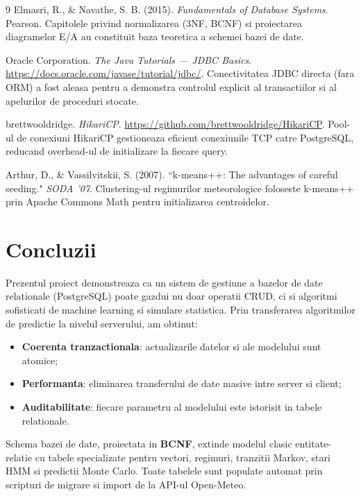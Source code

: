 \documentclass[12pt,a4paper]{article}
\begin{document}
\begin{thebibliography}{9}
 Elmasri, R., \& Navathe, S. B. (2015). \textit{Fundamentals of Database Systems}. Pearson. Capitolele privind normalizarea (3NF, BCNF) si proiectarea diagramelor E/A au constituit baza teoretica a schemei bazei de date.

 Oracle Corporation. \textit{The Java Tutorials --- JDBC Basics}. \url{https://docs.oracle.com/javase/tutorial/jdbc/}. Conectivitatea JDBC directa (fara ORM) a fost aleasa pentru a demonstra controlul explicit al transactiilor si al apelurilor de proceduri stocate.

 brettwooldridge. \textit{HikariCP}. \url{https://github.com/brettwooldridge/HikariCP}. Pool-ul de conexiuni HikariCP gestioneaza eficient conexiunile TCP catre PostgreSQL, reducand overhead-ul de initializare la fiecare query.

 Arthur, D., \& Vassilvitskii, S. (2007). ``k-means++: The advantages of careful seeding." \textit{SODA '07}. Clustering-ul regimurilor meteorologice foloseste k-means++ prin Apache Commons Math pentru initializarea centroidelor.

\end{thebibliography}

\newpage

\section{Concluzii}

Prezentul proiect demonstreaza ca un sistem de gestiune a bazelor de date relationale (PostgreSQL) poate gazdui nu doar operatii CRUD, ci si algoritmi sofisticati de machine learning si simulare statistica. Prin transferarea algoritmilor de predictie la nivelul serverului, am obtinut:

\begin{itemize}
    \item \textbf{Coerenta tranzactionala}: actualizarile datelor si ale modelului sunt atomice;
    \item \textbf{Performanta}: eliminarea transferului de date masive intre server si client;
    \item \textbf{Auditabilitate}: fiecare parametru al modelului este istorisit in tabele relationale.
\end{itemize}

Schema bazei de date, proiectata in \textbf{BCNF}, extinde modelul clasic entitate-relatie cu tabele specializate pentru vectori, regimuri, tranzitii Markov, stari HMM si predictii Monte Carlo. Toate tabelele sunt populate automat prin scripturi de migrare si import de la API-ul Open-Meteo.
\end{document}

